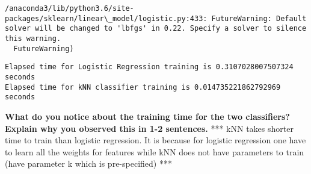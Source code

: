 \documentclass[11pt]{article}
\begin{document}
    \begin{Verbatim}[commandchars=\\\{\}]
/anaconda3/lib/python3.6/site-packages/sklearn/linear\_model/logistic.py:433: FutureWarning: Default solver will be changed to 'lbfgs' in 0.22. Specify a solver to silence this warning.
  FutureWarning)

    \end{Verbatim}

    \begin{Verbatim}[commandchars=\\\{\}]
Elapsed time for Logistic Regression training is 0.3107028007507324 seconds
Elapsed time for kNN classifier training is 0.014735221862792969 seconds

    \end{Verbatim}

    \textbf{What do you notice about the training time for the two
classifiers? Explain why you observed this in 1-2 sentences.} *** kNN
takes shorter time to train than logistic regression. It is because for
logistic regression one have to learn all the weights for features while
kNN does not have parameters to train (have parameter k which is
pre-specified) ***
\end{document}
